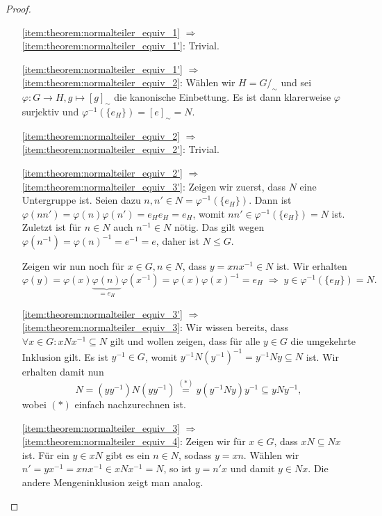 \begin{proof}{\ }
    \begin{itemize}[topsep=0cm, leftmargin=2.2cm]
        \item[\ref*{item:theorem:normalteiler_equiv_1} $\Rightarrow$ \ref*{item:theorem:normalteiler_equiv_1'}:] 
        Trivial.
        
        \item[\ref*{item:theorem:normalteiler_equiv_1'} $\Rightarrow$ \ref*{item:theorem:normalteiler_equiv_2}:] 
        Wählen wir $H = G/_\sim$ und sei $\varphi: G \to H, g \mapsto [g]_\sim$ die kanonische Einbettung. Es ist dann klarerweise $\varphi$ surjektiv und $\varphi^{-1}(\{e_H\}) = [e]_\sim = N$.
        
        \item[\ref*{item:theorem:normalteiler_equiv_2} $\Rightarrow$ \ref*{item:theorem:normalteiler_equiv_2'}:] 
        Trivial.
        
        \item[\ref*{item:theorem:normalteiler_equiv_2'} $\Rightarrow$ \ref*{item:theorem:normalteiler_equiv_3'}:] 
        Zeigen wir zuerst, dass $N$ eine Untergruppe ist. Seien dazu $n, n' \in N = \varphi^{-1}(\{e_H\})$. Dann ist $\varphi(n n') = \varphi(n) \varphi(n') = e_H e_H = e_H$, womit $n n' \in \varphi^{-1}(\{e_H\}) = N$ ist.
        Zuletzt ist für $n\in N$ auch $n^{-1}\in N$ nötig. Das gilt wegen $\varphi(n^{-1})=\varphi(n)^{-1}=e^{-1}=e$, daher ist $N \le G$.

        Zeigen wir nun noch für $x \in G, n \in N$, dass $y = xnx^{-1} \in N$ ist. Wir erhalten $$\varphi(y) = \varphi(x) \underbrace{\varphi(n)}_{= e_H} \varphi(x^{-1}) = \varphi(x)\varphi(x)^{-1} = e_H \;\Rightarrow\; y \in \varphi^{-1}(\{e_H\}) = N.$$

        \item[\ref*{item:theorem:normalteiler_equiv_3'} $\Rightarrow$ \ref*{item:theorem:normalteiler_equiv_3}:] 
        Wir wissen bereits, dass $\forall x \in G: xNx^{-1} \subseteq N$ gilt und wollen zeigen, dass für alle $y \in G$ die umgekehrte Inklusion gilt. Es ist $y^{-1} \in G$, womit $y^{-1}N(y^{-1})^{-1} = y^{-1}Ny \subseteq N$ ist. Wir erhalten damit nun 
        $$ N = (y y^{-1}) N (y y^{-1}) \overset{(*)}{=} y (y^{-1} N y) y^{-1} \subseteq y N y^{-1}, $$
        wobei $(*)$ einfach nachzurechnen ist.
        
        \item[\ref*{item:theorem:normalteiler_equiv_3} $\Rightarrow$ \ref*{item:theorem:normalteiler_equiv_4}:] 
        Zeigen wir für $x \in G$, dass $xN \subseteq Nx$ ist. Für ein $y \in xN$ gibt es ein $n \in N$, sodass $y = xn$. Wählen wir $n' = yx^{-1} = xnx^{-1} \in xNx^{-1} = N$, so ist $y = n'x$ und damit $y \in Nx$. Die andere Mengeninklusion zeigt man analog. 
        

\end{itemize}
\end{proof}

